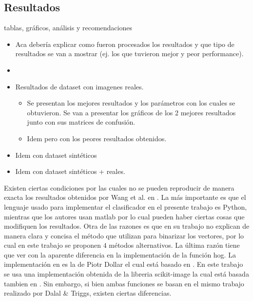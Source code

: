 \newpage
\subsection{Resultados}

\label{subsection:resultados}
	tablas, gráficos, análisis y recomendaciones
	\begin{itemize}
		\item Aca debería explicar como fueron procesados los
                  resultados y que tipo de resultados se van a mostrar (ej. los
                  que tuvieron mejor y peor performance). 
                \item {}
		\item Resultados de dataset con imagenes reales.
		\begin{itemize}
			\item Se presentan los mejores resultados y los parámetros con los cuales se obtuvieron. Se van a presentar los gráficos de los 2 mejores resultados junto con sus matrices de confusión.
			\item Idem pero con los peores resultados obtenidos.
		\end{itemize}
		\item Idem con dataset sintéticos
		\item Idem con dataset sintéticos + reales.

	\end{itemize}
	
	Existen ciertas condiciones por las cuales no se pueden reproducir de manera exacta los resultados obtenidos por Wang et al. en \cite{wang}. La más importante es que el lenguaje usado para implementar el clasificador en el presente trabajo es Python, mientras que los autores usan matlab por lo cual pueden haber ciertas cosas que modifiquen los resultados. Otra de las razones es que en su trabajo no explican de manera clara y concisa el método que utilizan para binarizar los vectores, por lo cual en este trabajo se proponen $4$ métodos alternativos. La última razón tiene que ver con la aparente diferencia en la implementación de la función hog. La implementación en \cite{wang} es la de Piotr Dollar el cual está basado en \cite{DT05}. En este trabajo se usa una implementación obtenida de la libreria scikit-image la cual está basada tambien en \cite{DT05}. Sin embargo, si bien ambas funciones se basan en el mismo trabajo realizado por Dalal \& Triggs, existen ciertas diferencias.
	
